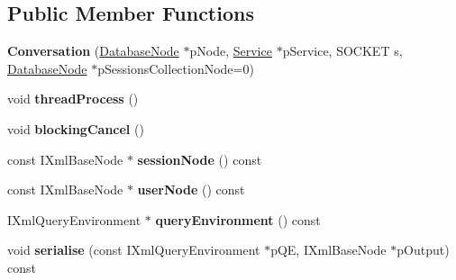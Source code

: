 \subsection*{\-Public \-Member \-Functions}
\begin{DoxyCompactItemize}
\item 
\hypertarget{classgeneral__server_1_1Conversation_a536a3ab51c7cc8b29723c1a499e29d99}{{\bfseries \-Conversation} (\hyperlink{classgeneral__server_1_1DatabaseNode}{\-Database\-Node} $\ast$p\-Node, \hyperlink{classgeneral__server_1_1Service}{\-Service} $\ast$p\-Service, \-S\-O\-C\-K\-E\-T s, \hyperlink{classgeneral__server_1_1DatabaseNode}{\-Database\-Node} $\ast$p\-Sessions\-Collection\-Node=0)}\label{classgeneral__server_1_1Conversation_a536a3ab51c7cc8b29723c1a499e29d99}

\item 
\hypertarget{classgeneral__server_1_1Conversation_afe32f9846353bafc92fcdb6ac8070eb6}{void {\bfseries thread\-Process} ()}\label{classgeneral__server_1_1Conversation_afe32f9846353bafc92fcdb6ac8070eb6}

\item 
\hypertarget{classgeneral__server_1_1Conversation_acea95d47748d04b9e46c16798a997ca8}{void {\bfseries blocking\-Cancel} ()}\label{classgeneral__server_1_1Conversation_acea95d47748d04b9e46c16798a997ca8}

\item 
\hypertarget{classgeneral__server_1_1Conversation_af9650eb23e846b647538d7cb8d1da3c8}{const \-I\-Xml\-Base\-Node $\ast$ {\bfseries session\-Node} () const }\label{classgeneral__server_1_1Conversation_af9650eb23e846b647538d7cb8d1da3c8}

\item 
\hypertarget{classgeneral__server_1_1Conversation_a984902f5ab896139bdf1997156605cb3}{const \-I\-Xml\-Base\-Node $\ast$ {\bfseries user\-Node} () const }\label{classgeneral__server_1_1Conversation_a984902f5ab896139bdf1997156605cb3}

\item 
\hypertarget{classgeneral__server_1_1Conversation_a95256e7a5340a1f20bdcb3260c91e05c}{\-I\-Xml\-Query\-Environment $\ast$ {\bfseries query\-Environment} () const }\label{classgeneral__server_1_1Conversation_a95256e7a5340a1f20bdcb3260c91e05c}

\item 
\hypertarget{classgeneral__server_1_1Conversation_a0613cfa14efb28787b08b8406e02772d}{void {\bfseries serialise} (const \-I\-Xml\-Query\-Environment $\ast$p\-Q\-E, \-I\-Xml\-Base\-Node $\ast$p\-Output) const }\label{classgeneral__server_1_1Conversation_a0613cfa14efb28787b08b8406e02772d}


\end{DoxyCompactItemize}

